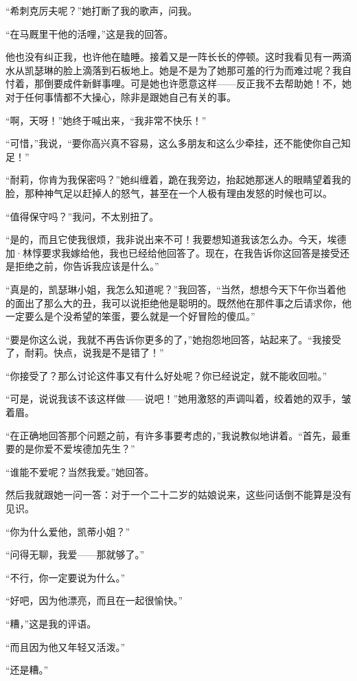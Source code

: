 \par “希刺克厉夫呢？”她打断了我的歌声，问我。
\par “在马厩里干他的活哩，”这是我的回答。
\par 他也没有纠正我，也许他在瞌睡。接着又是一阵长长的停顿。这时我看见有一两滴水从凯瑟琳的脸上滴落到石板地上。她是不是为了她那可羞的行为而难过呢？我自忖着，那倒要成件新鲜事哩。可是她也许愿意这样——反正我不去帮助她！不，她对于任何事情都不大操心，除非是跟她自己有关的事。
\par “啊，天呀！”她终于喊出来，“我非常不快乐！”
\par “可惜，”我说，“要你高兴真不容易，这么多朋友和这么少牵挂，还不能使你自己知足！”
\par “耐莉，你肯为我保密吗？”她纠缠着，跪在我旁边，抬起她那迷人的眼睛望着我的脸，那种神气足以赶掉人的怒气，甚至在一个人极有理由发怒的时候也可以。
\par “值得保守吗？”我问，不太别扭了。
\par “是的，而且它使我很烦，我非说出来不可！我要想知道我该怎么办。今天，埃德加·林惇要求我嫁给他，我也已经给他回答了。现在，在我告诉你这回答是接受还是拒绝之前，你告诉我应该是什么。”
\par “真是的，凯瑟琳小姐，我怎么知道呢？”我回答，“当然，想想今天下午你当着他的面出了那么大的丑，我可以说拒绝他是聪明的。既然他在那件事之后请求你，他一定要么是个没希望的笨蛋，要么就是一个好冒险的傻瓜。”
\par “要是你这么说，我就不再告诉你更多的了，”她抱怨地回答，站起来了。“我接受了，耐莉。快点，说我是不是错了！”
\par “你接受了？那么讨论这件事又有什么好处呢？你已经说定，就不能收回啦。”
\par “可是，说说我该不该这样做——说吧！”她用激怒的声调叫着，绞着她的双手，皱着眉。
\par “在正确地回答那个问题之前，有许多事要考虑的，”我说教似地讲着。“首先，最重要的是你爱不爱埃德加先生？”
\par “谁能不爱呢？当然我爱。”她回答。
\par 然后我就跟她一问一答：对于一个二十二岁的姑娘说来，这些问话倒不能算是没有见识。
\par “你为什么爱他，凯蒂小姐？”
\par “问得无聊，我爱——那就够了。”
\par “不行，你一定要说为什么。”
\par “好吧，因为他漂亮，而且在一起很愉快。”
\par “糟，”这是我的评语。
\par “而且因为他又年轻又活泼。”
\par “还是糟。”

